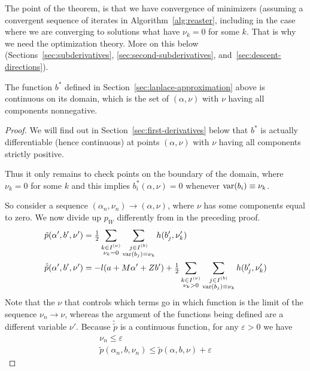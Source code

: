 The point of the theorem, is that we have convergence of minimizers
(assuming a convergent sequence of iterates in Algorithm~\ref{alg:reaster},
including in the case where we
are converging to solutions what have $\nu_k = 0$ for some $k$.
That is why we need the optimization theory.  More on this below
(Sections~\ref{sec:subderivatives}, \ref{sec:second-subderivatives},
and~\ref{sec:descent-directions}).

\begin{lemma} \label{lem:bee-star}
The function $b^*$ defined in Section~\ref{sec:laplace-approximation} above
is continuous on its domain, which is the set of $(\alpha, \nu)$ with
$\nu$ having all components nonnegative.
\end{lemma}
\begin{proof}
We will find out in Section~\ref{sec:first-derivatives} below that
$b^*$ is actually differentiable (hence continuous) at points $(\alpha, \nu)$
with $\nu$ having all components strictly positive.

Thus it only remains to check points on the boundary of the domain,
where $\nu_k = 0$ for some $k$ and this implies $b^*_i(\alpha, \nu) = 0$
whenever $\operatorname{var}(b_i) \equiv \nu_k$.

So consider a sequence $(\alpha_n, \nu_n) \to (\alpha, \nu)$, where $\nu$
has some components equal to zero.  We now divide up $p_W$ differently
from in the preceding proof.
\begin{align*}
   \tilde{p}(\alpha', b', \nu')
   & =
   \tfrac{1}{2}
   \sum_{\substack{k \in I^{(\nu)} \\ \nu_k = 0}}
   \sum_{\substack{j \in I^{(b)} \\ \operatorname{var}(b_j) \equiv \nu_k}}
   h(b_j', \nu_k')
   \\
   \tilde{\tilde{p}}(\alpha', b', \nu')
   & =
   - l(a + M \alpha' + Z b')
   + \tfrac{1}{2}
   \sum_{\substack{k \in I^{(\nu)} \\ \nu_k > 0}}
   \sum_{\substack{j \in I^{(b)} \\ \operatorname{var}(b_j) \equiv \nu_k}}
   h(b_j', \nu_k')
\end{align*}
Note that the $\nu$ that controls which terms go in which function is
the limit of the sequence $\nu_n \to \nu$, whereas the argument of the
functions being defined are a different variable $\nu'$.
Because $\tilde{\tilde{p}}$ is a continuous function, for any $\varepsilon > 0$
we have
\begin{gather*}
    \nu_n \le \varepsilon
    \\
   \tilde{p}(\alpha_n, b, \nu_n) \le
   \tilde{p}(\alpha, b, \nu) + \varepsilon
\end{gather*}
\end{proof}

